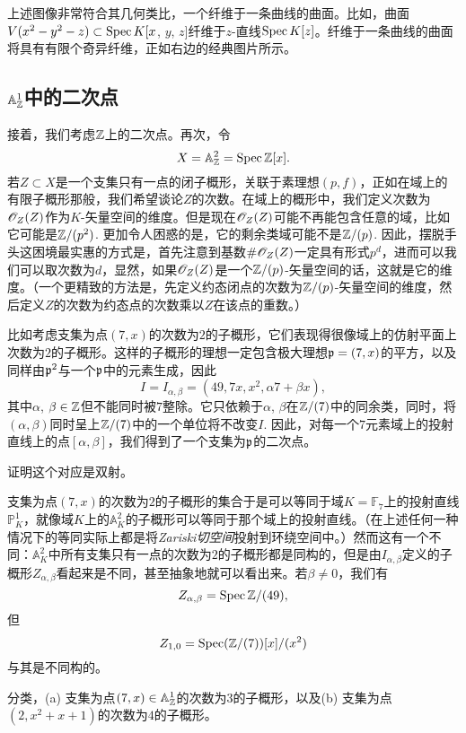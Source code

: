 上述图像非常符合其几何类比，一个纤维于一条曲线的曲面。比如，曲面$V(x^2-y^2-z)\subset \operatorname{Spec} K[x$, $y$, $z]$纤维于$z$-直线$\operatorname{Spec} K[z]$。纤维于一条曲线的曲面将具有有限个奇异纤维，正如右边的经典图片所示。

\subsection{\texorpdfstring{$\mathbb{A}_{\mathbb{Z}}^1$}{AZ1}中的二次点} \label{s:2.4.5}

接着，我们考虑$\mathbb{Z}$上的二次点。再次，令
\[
	X=\mathbb{A}_{\mathbb{Z}}^2=\operatorname{Spec}\mathbb{Z}[x].
\]
若$Z\subset X$是一个支集只有一点的闭子概形，关联于素理想$(p,f)$，正如在域上的有限子概形那般，我们希望谈论$Z$的次数。在域上的概形中，我们定义次数为$\mathscr{O}_Z(Z)$作为$K$\hyp 矢量空间的维度。但是现在$\mathscr{O}_Z(Z)$可能不再能包含任意的域，比如它可能是$\mathbb{Z}/(p^2)$. 更加令人困惑的是，它的剩余类域可能不是$\mathbb{Z}/(p)$. 因此，摆脱手头这困境最实惠的方式是，首先注意到基数$\# \mathscr{O}_Z(Z)$一定具有形式$p^d$，进而可以我们可以取次数为$d$，显然，如果$\mathscr{O}_Z(Z)$是一个$\mathbb{Z}/(p)$\hyp 矢量空间的话，这就是它的维度。（一个更精致的方法是，先定义约态闭点的次数为$\mathbb{Z}/(p)$\hyp 矢量空间的维度，然后定义$Z$的次数为约态点的次数乘以$Z$在该点的重数。）

比如考虑支集为点$(7,x)$的次数为$2$的子概形，它们表现得很像域上的仿射平面上次数为$2$的子概形。这样的子概形的理想一定包含极大理想$\mathfrak{p}=(7,x)$的平方，以及同样由$\mathfrak{p}^2$与一个$\mathfrak{p}$中的元素生成，因此
\[
	I=I_{\alpha,\beta}=(49,7x,x^2,\alpha 7+\beta x),
\]
其中$\alpha$, $\beta\in\mathbb{Z}$但不能同时被$7$整除。它只依赖于$\alpha$, $\beta$在$\mathbb{Z}/(7)$中的同余类，同时，将$(\alpha,\beta)$同时呈上$\mathbb{Z}/(7)$中的一个单位将不改变$I$. 因此，对每一个$7$元素域上的投射直线上的点$[\alpha,\beta]$，我们得到了一个支集为$\mathfrak{p}$的二次点。

\begin{exe}
证明这个对应是双射。
\end{exe}

支集为点$(7,x)$的次数为$2$的子概形的集合于是可以等同于域$K=\mathbb{F}_7$上的投射直线$\mathbb{P}_K^1$，就像域$K$上的$\mathbb{A}_K^2$的子概形可以等同于那个域上的投射直线。（在上述任何一种情况下的等同实际上都是将\textit{Zariski切空间}投射到环绕空间中。）然而这有一个不同：$\mathbb{A}_K^2$中所有支集只有一点的次数为$2$的子概形都是同构的，但是由$I_{\alpha,\beta}$定义的子概形$Z_{\alpha,\beta}$看起来是不同，甚至抽象地就可以看出来。若$\beta\neq 0$，我们有
\[
	Z_{\alpha,\beta}=\operatorname{Spec} \mathbb{Z}/(49),
\]
但
\[
	Z_{1,0}=\operatorname{Spec}(\mathbb{Z}/(7))[x]/(x^2)
\]
与其是不同构的。

\begin{exe}
分类，(a) 支集为点$(7,x)\in\mathbb{A}_{\mathbb{Z}}^1$的次数为$3$的子概形，以及(b) 支集为点$(2,x^2+x+1)$的次数为$4$的子概形。
\end{exe}

